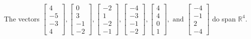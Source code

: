 \begin{exercise}
\begin{exerciseStatement}
  \end{exerciseStatement}
  \begin{exerciseAnswer}
   The vectors \(\left[\begin{array}{r}
4 \\
-5 \\
-3 \\
4
\end{array}\right] , \left[\begin{array}{r}
0 \\
3 \\
-1 \\
-2
\end{array}\right] , \left[\begin{array}{r}
-2 \\
1 \\
-2 \\
-1
\end{array}\right] , \left[\begin{array}{r}
-4 \\
-3 \\
-1 \\
-2
\end{array}\right] , \left[\begin{array}{r}
4 \\
4 \\
0 \\
1
\end{array}\right] , \text{ and } \left[\begin{array}{r}
-4 \\
-1 \\
2 \\
-4
\end{array}\right]\) 
  	 do  
	span \(\mathbb{R}^4\).
  


  \end{exerciseAnswer}
\end{exercise}